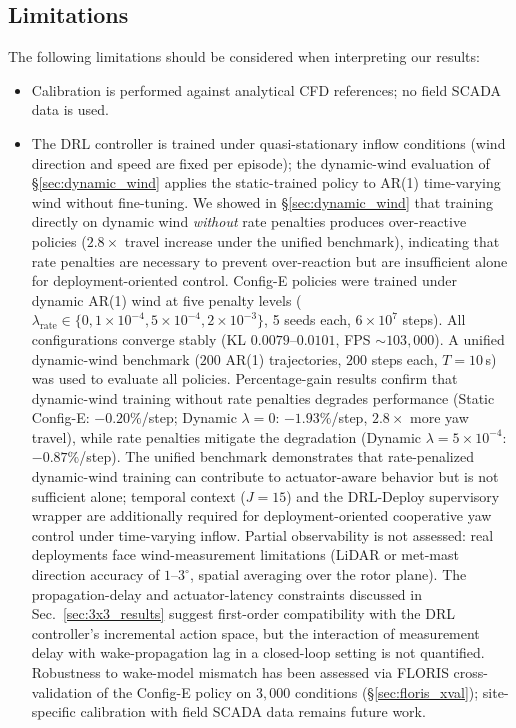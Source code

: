 \documentclass[final,5p,times]{elsarticle}
\begin{document}
\subsection{Limitations}
The following limitations should be considered when interpreting our results:
\begin{itemize}
\item Calibration is performed against analytical CFD references; no field SCADA data is used.
\item The DRL controller is trained under quasi-stationary inflow conditions (wind direction and speed are fixed per episode); the dynamic-wind evaluation of \S\ref{sec:dynamic_wind} applies the static-trained policy to AR(1) time-varying wind without fine-tuning. We showed in \S\ref{sec:dynamic_wind} that training directly on dynamic wind \emph{without} rate penalties produces over-reactive policies ($2.8{\times}$ travel increase under the unified benchmark), indicating that rate penalties are necessary to prevent over-reaction but are insufficient alone for deployment-oriented control. Config-E policies were trained under dynamic AR(1) wind at five penalty levels ($\lambda_\mathrm{rate} \in \{0, 1{\times}10^{-4}, 5{\times}10^{-4}, 2{\times}10^{-3}\}$, 5 seeds each, $6{\times}10^{7}$ steps). All configurations converge stably (KL $0.0079$--$0.0101$, FPS ${\sim}103{,}000$). A unified dynamic-wind benchmark ($200$ AR(1) trajectories, $200$ steps each, $T{=}10$\,s) was used to evaluate all policies. Percentage-gain results confirm that dynamic-wind training without rate penalties degrades performance (Static Config-E: $-0.20\%$/step; Dynamic $\lambda{=}0$: $-1.93\%$/step, $2.8{\times}$ more yaw travel), while rate penalties mitigate the degradation (Dynamic $\lambda{=}5{\times}10^{-4}$: $-0.87\%$/step). The unified benchmark demonstrates that rate-penalized dynamic-wind training can contribute to actuator-aware behavior but is not sufficient alone; temporal context ($J{=}15$) and the DRL-Deploy supervisory wrapper are additionally required for deployment-oriented cooperative yaw control under time-varying inflow. Partial observability is not assessed: real deployments face wind-measurement limitations (LiDAR or met-mast direction accuracy of $1$--$3^\circ$, spatial averaging over the rotor plane). The propagation-delay and actuator-latency constraints discussed in Sec.~\ref{sec:3x3_results} suggest first-order compatibility with the DRL controller's incremental action space, but the interaction of measurement delay with wake-propagation lag in a closed-loop setting is not quantified. Robustness to wake-model mismatch has been assessed via FLORIS cross-validation of the Config-E policy on $3{,}000$ conditions (\S\ref{sec:floris_xval}); site-specific calibration with field SCADA data remains future work.

\end{itemize}
\end{document}

